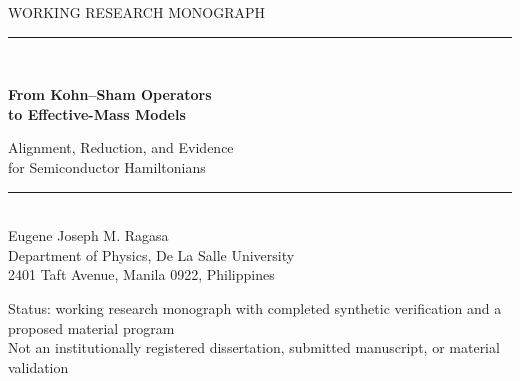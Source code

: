 \documentclass[12pt,oneside]{report}
\theoremstyle{monographplain}
\theoremstyle{monographdefinition}
\newcommand{\makecooltitle}{%
  \begin{titlepage}
    \centering
    \vspace*{1.8cm}

    {\color{muted}\small\MakeUppercase{Working Research Monograph}}\\[0.4cm]
    {\color{indigo}\rule{2.2cm}{0.6pt}}\\[1.2cm]

    {\LARGE\bfseries\color{charcoal}%
      From Kohn--Sham Operators\\[0.25em]
      to Effective-Mass Models\par}

    \vspace{0.55cm}
    {\large\color{muted}%
      Alignment, Reduction, and Evidence\\[0.15em]
      for Semiconductor Hamiltonians\par}

    \vspace{0.7cm}
    {\color{indigo}\rule{3.2cm}{1pt}}\\[1.4cm]

    {\large\color{charcoal} Eugene Joseph M. Ragasa}\\[0.35cm]
    {\normalsize\color{muted}
      Department of Physics, De La Salle University\\
      2401 Taft Avenue, Manila 0922, Philippines}

    \vfill

    {\color{muted}\small
      Status: working research monograph with completed synthetic verification and a proposed material program\\[0.15cm]
      Not an institutionally registered dissertation, submitted manuscript, or material validation}

    \vspace{1.2cm}
  \end{titlepage}
}
\begin{document}
\hypersetup{pageanchor=false}
\makecooltitle          %

\begin{abstract}
\setlength{\parindent}{0pt}
\setlength{\parskip}{0.8\baselineskip}
This monograph develops a controlled framework for investigating when a
first-principles Kohn--Sham operator for pristine or substitutionally doped
silicon can be replaced by a reduced lattice or continuum Hamiltonian. The
proposed reduction path proceeds through retained Bloch subspaces, localized
Wannier representations, tight-binding model classes, aligned impurity
operators, and effective-mass descriptions.

The central requirement is that operators be compared only after their state
spaces, retained subspaces, bases, gauges, geometries, spin conventions, units,
and energy references have been explicitly identified. The framework therefore
distinguishes projection, representation change, alignment, truncation, and
model fitting; separates spectral agreement from aligned-operator agreement;
and tracks parent-model, numerical, and model-reduction errors independently.
Nested reduced-operator classes and structured learning are developed as
proposed diagnostics for determining which physical constraints and model
complexities are supported by the parent representation.

A coordinated proof and evidence program records finite-dimensional operator
identities, alignment and reduction obligations, analytical bounds,
mechanization status, software verification, numerical verification, scientific
validation, and uncertainty quantification. At the present evidence boundary,
the project supports a represented-operator software foundation, bounded
tutorial and bootstrap observations, and human-accepted synthetic numerical
verification. The periodic benchmarks cover one- and two-dimensional scalar,
composite-band, topology, hopping, and localization diagnostics. The expanded
two-dimensional fixed-protocol study retains nonconverged trajectories and
unsupported mesh-convergence and repeated-basin criteria as negative evidence.
Separate spin-space and one-dimensional defect benchmarks verify compatibility,
alignment, independent extraction routes, a finite-rank spectral oracle, and
continuum refinement for their declared synthetic systems.

Only one trial-projection family was executed, so the closed periodic benchmark
does not establish projection-family robustness, global optimization, or
general Wannier convergence. Two-dimensional defect extraction is active as a
controlled synthetic task but has no calculated result; material transfer
remains proposed and inactive. The project does not yet support an accepted
production bulk parent, material Wannier operator, first-principles impurity
operator, effective-mass crossover, scientific validation for silicon, or
uncertainty quantification.
\end{abstract}
\end{document}
